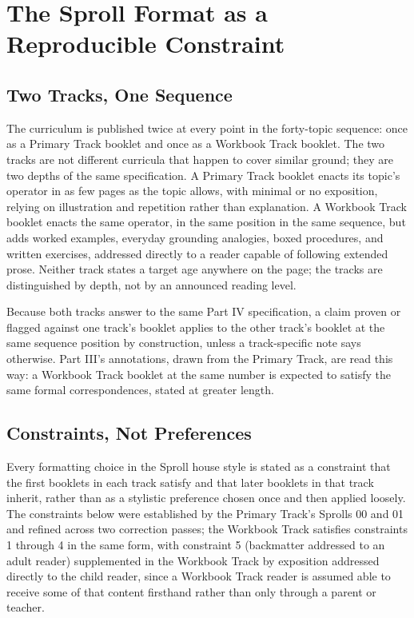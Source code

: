 \documentclass[11pt,twoside]{book}
\begin{document}
\chapter{The Sproll Format as a Reproducible Constraint}

\section{Two Tracks, One Sequence}

The curriculum is published twice at every point in the forty-topic sequence: once as a Primary Track booklet and once as a Workbook Track booklet. The two tracks are not different curricula that happen to cover similar ground; they are two depths of the same specification. A Primary Track booklet enacts its topic's operator in as few pages as the topic allows, with minimal or no exposition, relying on illustration and repetition rather than explanation. A Workbook Track booklet enacts the same operator, in the same position in the same sequence, but adds worked examples, everyday grounding analogies, boxed procedures, and written exercises, addressed directly to a reader capable of following extended prose. Neither track states a target age anywhere on the page; the tracks are distinguished by depth, not by an announced reading level.

Because both tracks answer to the same Part IV specification, a claim proven or flagged against one track's booklet applies to the other track's booklet at the same sequence position by construction, unless a track-specific note says otherwise. Part III's annotations, drawn from the Primary Track, are read this way: a Workbook Track booklet at the same number is expected to satisfy the same formal correspondences, stated at greater length.

\section{Constraints, Not Preferences}

Every formatting choice in the Sproll house style is stated as a constraint that the first booklets in each track satisfy and that later booklets in that track inherit, rather than as a stylistic preference chosen once and then applied loosely. The constraints below were established by the Primary Track's Sprolls 00 and 01 and refined across two correction passes; the Workbook Track satisfies constraints 1 through 4 in the same form, with constraint 5 (backmatter addressed to an adult reader) supplemented in the Workbook Track by exposition addressed directly to the child reader, since a Workbook Track reader is assumed able to receive some of that content firsthand rather than only through a parent or teacher.
\end{document}
